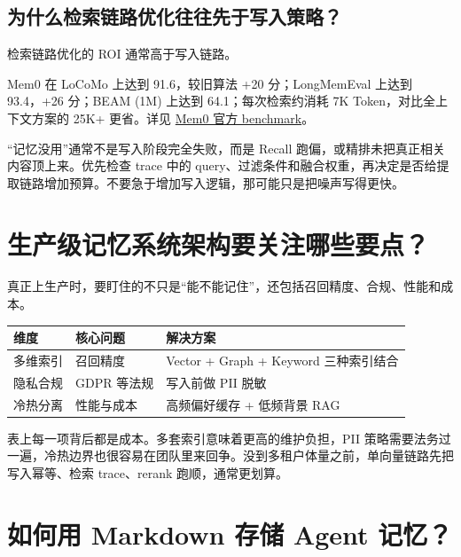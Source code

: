 \documentclass[9pt,a4paper,twocolumn]{ctexart}
\begin{document}
\subsection*{为什么检索链路优化往往先于写入策略？}


检索链路优化的 ROI 通常高于写入链路。



Mem0 在 LoCoMo 上达到 91.6，较旧算法 +20 分；LongMemEval 上达到 93.4，+26 分；BEAM (1M) 上达到 64.1；每次检索约消耗 7K Token，对比全上下文方案的 25K+ 更省。详见 \href{https://docs.mem0.ai/core-concepts/memory-evaluation}{Mem0 官方 benchmark}。



“记忆没用”通常不是写入阶段完全失败，而是 Recall 跑偏，或精排未把真正相关内容顶上来。优先检查 trace 中的 query、过滤条件和融合权重，再决定是否给提取链路增加预算。不要急于增加写入逻辑，那可能只是把噪声写得更快。



\section*{生产级记忆系统架构要关注哪些要点？}


真正上生产时，要盯住的不只是“能不能记住”，还包括召回精度、合规、性能和成本。


{\footnotesize
\begin{tabular}{|p{}|p{}|p{}|}
\hline
\textbf{维度} & \textbf{核心问题} & \textbf{解决方案} \\
\hline
多维索引 & 召回精度 & Vector + Graph + Keyword 三种索引结合 \\
\hline
隐私合规 & GDPR 等法规 & 写入前做 PII 脱敏 \\
\hline
冷热分离 & 性能与成本 & 高频偏好缓存 + 低频背景 RAG \\
\hline
\end{tabular}
}



表上每一项背后都是成本。多套索引意味着更高的维护负担，PII 策略需要法务过一遍，冷热边界也很容易在团队里来回争。没到多租户体量之前，单向量链路先把写入幂等、检索 trace、rerank 跑顺，通常更划算。



\section*{如何用 Markdown 存储 Agent 记忆？}
\end{document}

